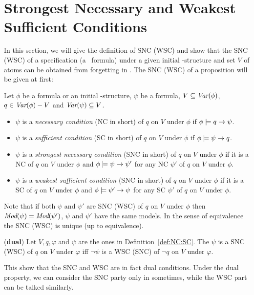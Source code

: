 \documentclass{article}
\begin{document}
\section{Strongest Necessary and Weakest Sufficient Conditions}
In this section, we will give the definition of SNC (WSC) and show that the SNC (WSC) of a specification (a \CTL\ formula) under a given initial \MPK-structure and set $V$ of atoms can be obtained from forgetting in \CTL.
The SNC (WSC) of a proposition will be given at first:
\begin{definition}\label{def:NC:SC}
Let $\phi$ be a formula or an initial \MPK-structure, $\psi$ be a formula, $V \subseteq \textit{Var}(\phi)$, $q\in\textit{Var}(\phi)- V$
and $\textit{Var}(\psi)\subseteq V$.
\begin{itemize}
  \item $\psi$  is a {\em necessary condition} (NC in short) of $q$ on $V$ under $\phi$
    if $\phi \models q \rightarrow \psi$.
  \item $\psi$  is a {\em sufficient condition} (SC in short) of $q$ on $V$ under $\phi$
    if $\phi \models \psi\rightarrow q$.
  \item $\psi$  is a {\em strongest necessary condition} (SNC in short)
  of $q$ on $V$ under $\phi$
    if it is a NC of $q$ on $V$ under $\phi$ and $\phi\models\psi\rightarrow\psi'$
    for any NC $\psi'$ of $q$ on $V$ under $\phi$.

    \item $\psi$  is a {\em weakest sufficient condition} (SNC in short)
  of $q$ on $V$ under $\phi$
    if it is a SC of $q$ on $V$ under $\phi$ and $\phi\models\psi'\rightarrow\psi$
    for any SC $\psi'$ of $q$ on $V$ under $\phi$.
\end{itemize}
\end{definition}
Note that if both $\psi$ and $\psi'$ are SNC (WSC) of $q$ on $V$ under $\phi$ then
$\textit{Mod}(\psi)=\textit{Mod}(\psi')$, \ie $\psi$ and $\psi'$ have the same models. In the sense
of equivalence the SNC (WSC) is unique (up to equivalence).



\begin{proposition}\label{dual}
(\textbf{dual})
 Let $V,q,\varphi$ and $\psi$ are the ones in Definition~\ref{def:NC:SC}.
 The $\psi$ is a SNC (WSC) of $q$ on $V$ under $\varphi$ iff $\neg \psi$ is a WSC (SNC)
    of $\neg q$ on $V$ under $\varphi$.
\end{proposition}
This show that the SNC and WSC are in fact dual conditions. Under the dual property, we can consider the SNC party only in sometimes, while
the WSC part can be talked similarly.
%
\end{document}
